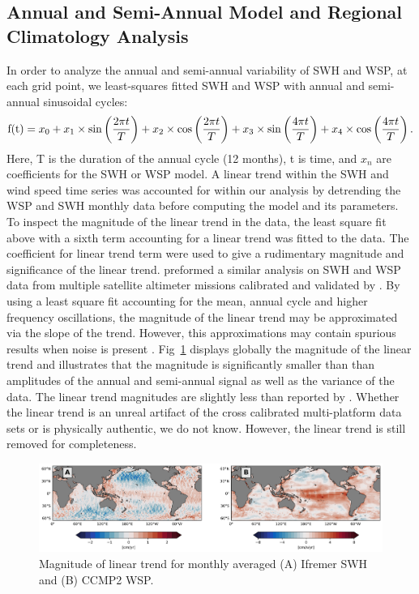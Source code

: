 \documentclass[12pt,twoside]{article}
\begin{document}

\subsection{Annual and Semi-Annual Model and Regional Climatology Analysis}

In order to analyze the annual and semi-annual variability of SWH and WSP, at each grid point, we least-squares fitted SWH and WSP with annual and semi-annual sinusoidal cycles: 
 \begin{equation}
     \mbox{\rm f(t)} = x_0 + x_1\times\sin\left(\frac{2{\pi}t}{T}\right) +  x_2\times\cos\left(\frac{2{\pi}t}{T}\right) + x_3\times\sin\left(\frac{4{\pi}t}{T}\right) + x_4\times\cos\left(\frac{4{\pi}t}{T}\right).
 \end{equation}
Here, T is the duration of the annual cycle (12 months), t is time, and $x_n$ are coefficients for the SWH or WSP model. A linear trend within the SWH and wind speed time series was accounted for within our analysis by detrending the WSP and SWH monthly data before computing the model and its parameters. To inspect the magnitude of the linear trend in the data, the least square fit above with a sixth term accounting for a linear trend was fitted to the data. The coefficient for linear trend term were used to give a rudimentary magnitude and significance of the linear trend. \citet{young2011global} preformed a similar analysis on SWH and WSP data from multiple satellite altimeter missions calibrated and validated by \citet{zieger2009joint}. By using a least square fit accounting for the mean, annual cycle and higher frequency oscillations, the magnitude of the linear trend may be approximated via the slope of the trend. However, this approximations may contain spurious results when noise is present \cite{young2011global}. Fig~\ref{Ifremer_ccmp2_lsf_linear_trend} displays globally the magnitude of the linear trend and illustrates that the magnitude is significantly smaller than than amplitudes of the annual and semi-annual signal as well as the variance of the data. The linear trend magnitudes are slightly less than reported by \citet{young2011global}. Whether the linear trend is an unreal artifact of the cross calibrated multi-platform data sets or is physically authentic, we do not know. However, the linear trend is still removed for completeness. 

\begin{figure}[tbh]
\centering
\includegraphics[width=1.0\textwidth]{figs/lsf_parameters/ccmp2_ifremer_linear_trend_magnitude.png}
\caption{Magnitude of linear trend for monthly averaged (A) Ifremer SWH and (B) CCMP2 WSP.}
\label{Ifremer_ccmp2_lsf_linear_trend}
\end{figure}
\end{document}
